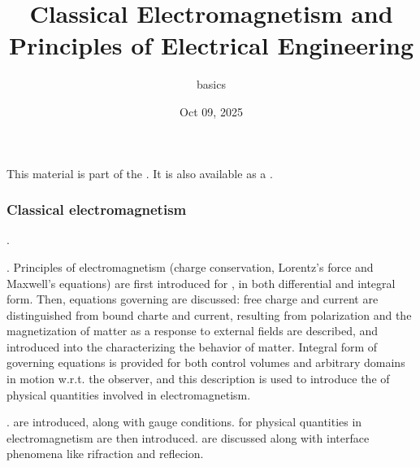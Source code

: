 \documentclass[letterpaper,10pt,english]{jupyterBook}
\title{Classical Electromagnetism and Principles of Electrical Engineering}
\date{Oct 09, 2025}
\author{basics}
\begin{document}
\pagestyle{empty}
\sphinxmaketitle
\pagestyle{plain}
\sphinxtableofcontents
\pagestyle{normal}
\label{\detokenize{intro::doc}}


\sphinxAtStartPar
This material is part of the . It is also available as a .
\subsubsection*{Classical electromagnetism}

\sphinxAtStartPar
{\hyperref[\detokenize{ch/experiments:classical-electromagnetism-first-experiments}]{}}. 

\sphinxAtStartPar
{\hyperref[\detokenize{ch/principles:classical-electromagnetism-principles}]{}}. Principles of electromagnetism (charge conservation, Lorentz’s force and Maxwell’s equations) are first introduced for {\hyperref[\detokenize{ch/principles-vacuum:classical-electromagnetism-principles-free-space}]{}}, in both differential and integral form. Then, equations governing {\hyperref[\detokenize{ch/principles-matter:classical-electromagnetism-principles-matter}]{}} are discussed: free charge and current are distinguished from bound charte and current, resulting from polarization and the magnetization of matter as a response to external fields are described, and introduced into the  characterizing the behavior of matter. Integral form of governing equations is provided for both control volumes and arbitrary domains in motion w.r.t. the observer, and this description is used to introduce the {\hyperref[\detokenize{ch/principles-relativity:classical-electromagnetism-principles-low-speed-relativity}]{}} of physical quantities involved in electromagnetism.

\sphinxAtStartPar
{\hyperref[\detokenize{ch/waves:classical-electromagnetism-waves}]{}}. {\hyperref[\detokenize{ch/potentials:classical-electromagnetism-potentials}]{}} are introduced, along with gauge conditions. {\hyperref[\detokenize{ch/waves-equation:classical-electromagnetism-waves-wave-equation}]{}} for physical quantities in electromagnetism are then introduced. {\hyperref[\detokenize{ch/waves-plane:classical-electromagnetism-waves-plane-waves}]{}} are discussed along with interface phenomena like rifraction and reflecion.
\end{document}
